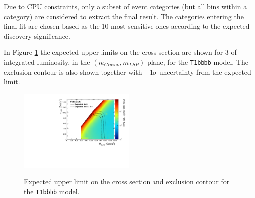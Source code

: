 Due to CPU constraints, only a subset of event categories (but all \scalht bins
within a category) are considered to extract the final result. 
The categories entering the final fit are chosen based as the 10 most sensitive ones according to the expected discovery significance.

In Figure \ref{fig:T1bbbb_plane_expected} the expected upper limits on the cross section are shown for 3 \ifb of integrated luminosity, in the $(m_{Gluino},m_{LSP})$ plane, for the \texttt{T1bbbb} model. 
The exclusion contour is also shown together with $\pm1\sigma$ uncertainty from the expected limit. 

\begin{figure}
  \begin{center}
    \includegraphics[width=0.5\textwidth]{figures/susyResults/xs_contour_withHisto} \\
    \caption{Expected upper limit on the cross section and exclusion contour for the \texttt{T1bbbb} model.}
    \label{fig:T1bbbb_plane_expected}
  \end{center}
\end{figure}





